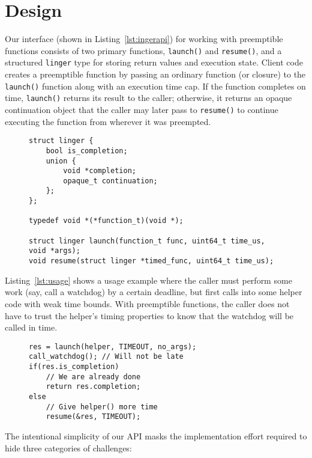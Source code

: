 \section{Design}

Our interface (shown in Listing~\ref{lst:ingerapi}) for working with
preemptible functions consists of two primary functions, \texttt{launch()} and
\texttt{resume()}, and a structured \texttt{linger} type for storing return values
and execution state.  Client code creates a preemptible function by passing an
ordinary function (or closure) to the \texttt{launch()} function along with an
execution time cap.  If the function completes on time,
\texttt{launch()} returns its result to the caller; otherwise, it returns an opaque
continuation object that the caller may later pass to \texttt{resume()} to continue
executing the function from wherever it was preempted.

\begin{figure}
\begin{lstlisting}[label=lst:ingerapi,caption=Preemptible functions C-language interface]
struct linger {
	bool is_completion;
	union {
		void *completion;
		opaque_t continuation;
	};
};

typedef void *(*function_t)(void *);

struct linger launch(function_t func, uint64_t time_us, void *args);
void resume(struct linger *timed_func, uint64_t time_us);
\end{lstlisting}
\end{figure}

Listing~\ref{lst:usage} shows a usage example where the caller must
perform some work (say, call a watchdog) by a certain deadline, but first
calls into some helper code with weak time bounds.  With preemptible functions,
the caller does not have to trust the helper's timing properties to know that the
watchdog will be called
in time.

\begin{figure}
\begin{lstlisting}[label=lst:usage,caption=Preemptible function usage example]
res = launch(helper, TIMEOUT, no_args);
call_watchdog(); // Will not be late
if(res.is_completion)
	// We are already done
	return res.completion;
else
	// Give helper() more time
	resume(&res, TIMEOUT);
\end{lstlisting}
\end{figure}

The intentional simplicity of our API masks the implementation effort required to
hide three categories of challenges:


